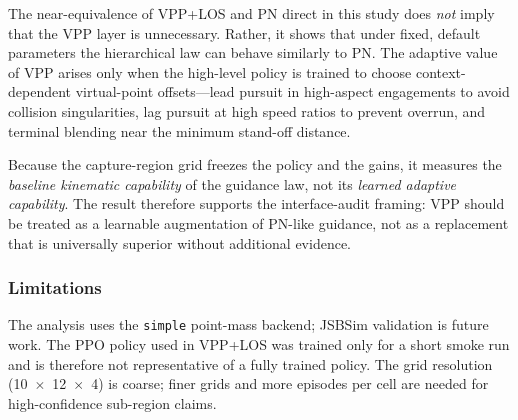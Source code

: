 The near-equivalence of VPP+LOS and PN direct in this study does \emph{not} imply that the VPP layer is unnecessary. Rather, it shows that under fixed, default parameters the hierarchical law can behave similarly to PN. The adaptive value of VPP arises only when the high-level policy is trained to choose context-dependent virtual-point offsets---lead pursuit in high-aspect engagements to avoid collision singularities, lag pursuit at high speed ratios to prevent overrun, and terminal blending near the minimum stand-off distance.

Because the capture-region grid freezes the policy and the gains, it measures the \emph{baseline kinematic capability} of the guidance law, not its \emph{learned adaptive capability}. The result therefore supports the interface-audit framing: VPP should be treated as a learnable augmentation of PN-like guidance, not as a replacement that is universally superior without additional evidence.

\subsubsection{Limitations}

The analysis uses the \texttt{simple} point-mass backend; JSBSim validation is future work. The PPO policy used in VPP+LOS was trained only for a short smoke run and is therefore not representative of a fully trained policy. The grid resolution (10~$\times$~12~$\times$~4) is coarse; finer grids and more episodes per cell are needed for high-confidence sub-region claims.
